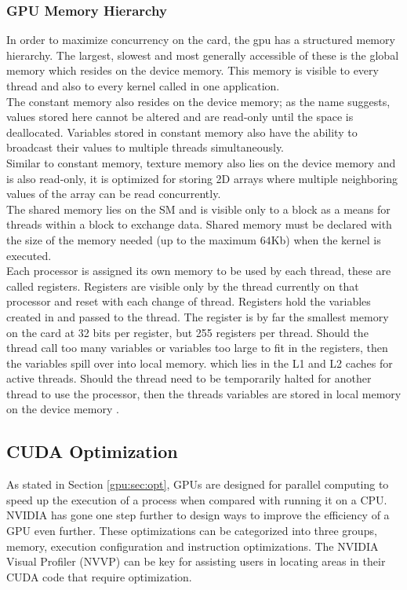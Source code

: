 \subsubsection{GPU Memory Hierarchy}\label{gpu:ssec:mem}
In order to maximize concurrency on the card, the \gls{gpu} has a structured memory hierarchy. The largest, slowest and most generally accessible of these is the global memory which resides on the device memory. This memory is visible to every thread and also to every kernel called in one application. 
\\
The constant memory also resides on the device memory; as the name suggests, values stored here cannot be altered and are read-only until the space is deallocated. Variables stored in constant memory also have the ability to broadcast their values to multiple threads simultaneously.
\\
Similar to constant memory, texture memory also lies on the device memory and is also read-only, it is optimized for storing 2D arrays where multiple neighboring values of the array can be read concurrently.
\\
The shared memory lies on the SM and is visible only to a block as a means for threads within a block to exchange data. Shared memory must be declared with the size of the memory needed (up to the maximum $64$Kb) when the kernel is executed.
\\
Each processor is assigned its own memory to be used by each thread, these are called registers. Registers are visible only by the thread currently on that processor and reset with each change of thread. Registers hold the variables created in and passed to the thread. The register is by far the smallest memory on the card at 32 bits per register, but 255 registers per thread. Should the thread call too many variables or variables too large to fit in the registers, then the variables spill over into local memory. which lies in the L1 and L2 caches for active threads. Should the thread need to be temporarily halted for another thread to use the processor, then the threads variables are stored in local memory on the device memory \citep{CUDA}.
%
\subsection{CUDA Optimization}\label{gpu:sec:cop}
As stated in Section \ref{gpu:sec:opt}, GPUs are designed for parallel computing to speed up the execution of a process when compared with running it on a CPU. NVIDIA has gone one step further to design ways to improve the efficiency of a GPU even further. These optimizations can be categorized into three groups, memory, execution configuration and instruction optimizations. The NVIDIA Visual Profiler (NVVP) can be key for assisting users in locating areas in their CUDA code that require optimization.
